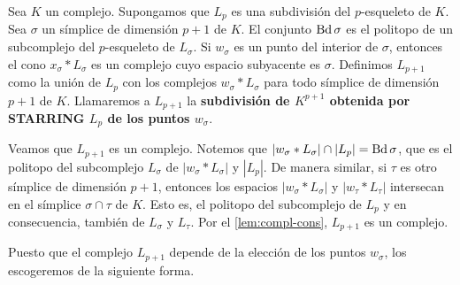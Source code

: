 \begin{definicion}
	Sea $K$ un complejo. Supongamos que $L_p$ es una subdivisión del $p$-esqueleto de $K$. Sea $\sigma$ un símplice de dimensión $p+1$ de $K$. El conjunto $\operatorname{Bd} \sigma$ es el politopo de un subcomplejo del $p$-esqueleto de $L_{\sigma}$. Si $w_{\sigma}$ es un punto del interior de $\sigma$, entonces el cono $x_\sigma \ast L_{\sigma}$ es un complejo cuyo espacio subyacente es $\sigma$. Definimos $L_{p+1}$ como la unión de $L_p$ con los complejos $w_{\sigma} \ast L_{\sigma}$ para todo símplice de dimensión $p+1$ de $K$.
	Llamaremos a $L_{p+1}$ la \textbf{subdivisión de $K^{p+1}$ obtenida por STARRING $L_p$ de los puntos $w_{\sigma}$}.
\end{definicion}

Veamos que $L_{p+1}$ es un complejo. Notemos que $|w_{\sigma} \ast L_{\sigma}|\cap|L_p| = \operatorname{Bd} \sigma$, que es el politopo del subcomplejo $L_{\sigma}$ de $|w_{\sigma} \ast L_{\sigma}|$ y $|L_p|$. De manera similar, si $\tau$ es otro símplice de dimensión $p+1$, entonces los espacios $|w_{\sigma} \ast L_{\sigma}|$ y $|w_{\tau} \ast L_{\tau}|$ intersecan en el símplice $\sigma \cap \tau$ de $K$. Esto es, el politopo del subcomplejo de $L_p$ y en consecuencia, también de $L_{\sigma}$ y $L_{\tau}$. Por el \autoref{lem:compl-cons}, $L_{p+1}$ es un complejo.

Puesto que el complejo $L_{p+1}$ depende de la elección de los puntos $w_{\sigma}$, los escogeremos de la siguiente forma.

